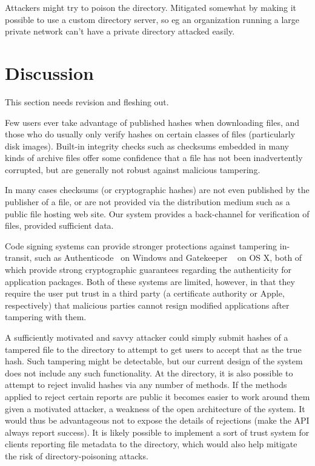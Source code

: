 \documentclass[letterpaper,twocolumn,10pt]{article}
\begin{document}
Attackers might try to poison the directory. Mitigated somewhat by making
it possible to use a custom directory server, so eg an organization running a large private
network can't have a private directory attacked easily.

\section{Discussion}

This section needs revision and fleshing out.

Few users ever take advantage of published hashes when downloading files, and those who do usually only verify hashes on certain classes of files (particularly disk images). Built-in integrity checks such as checksums embedded in many kinds of archive files offer some confidence that a file has not been inadvertently corrupted, but are generally not robust against malicious tampering.

In many cases checksums (or cryptographic hashes) are not even published by the publisher of a file, or are not provided via the distribution medium such as a public file hosting web site. Our system provides a back-channel for verification of files, provided sufficient data.

Code signing systems can provide stronger protections against tampering in-transit, such as Authenticode~\cite{Authenticode} on Windows and Gatekeeper ~\cite{Gatekeeper} on OS X, both of which provide strong cryptographic guarantees regarding the authenticity for application packages. Both of these systems are limited, however, in that they require the user put trust in a third party (a certificate authority or Apple, respectively) that malicious parties cannot resign modified applications after tampering with them.

A sufficiently motivated  and savvy attacker could simply submit hashes of a tampered file to the directory to attempt to get users to accept that as the true hash. Such tampering might be detectable, but our current design of the system does not include any such functionality. At the directory, it is also possible to attempt to reject invalid hashes via any number of methods. If the methods applied to reject certain reports are public it becomes easier to work around them given a motivated attacker, a weakness of the open architecture of the system. It would thus be advantageous not to expose the details of rejections (make the API always report success). It is likely possible to implement a sort of trust system for clients reporting file metadata to the directory, which would also help mitigate the risk of directory-poisoning attacks.
\end{document}
